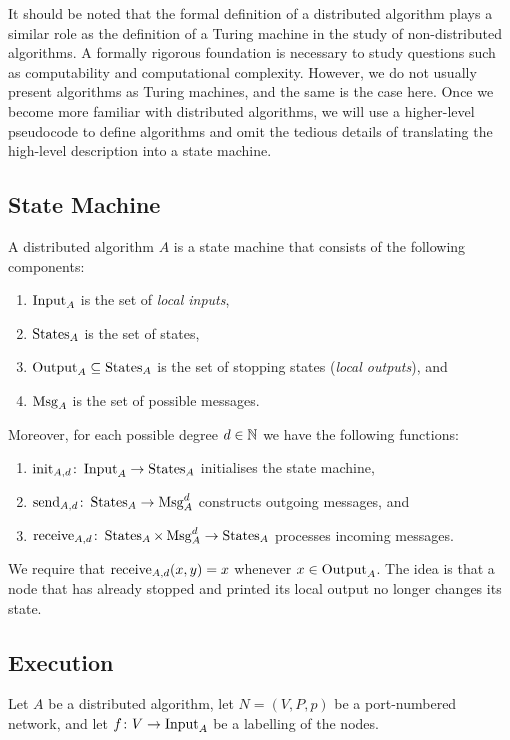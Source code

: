 It should be noted that the formal definition of a distributed algorithm plays a similar role as the definition of a Turing machine in the study of non-distributed algorithms. A formally rigorous foundation is necessary to study questions such as computability and computational complexity. However, we do not usually present algorithms as Turing machines, and the same is the case here. Once we become more familiar with distributed algorithms, we will use a higher-level pseudocode to define algorithms and omit the tedious details of translating the high-level description into a state machine.

\subsection{State Machine}

A distributed algorithm $A$ is a state machine that consists of the following components:
\begin{enumerate}[label=(\roman*)]
    \item $\operatorname{Input}_A$ is the set of \emph{local inputs},
    \item $\operatorname{States}_A$ is the set of states,
    \item $\operatorname{Output}_A \subseteq \operatorname{States}_A$ is the set of stopping states (\emph{local outputs}), and
    \item $\operatorname{Msg}_A$ is the set of possible messages.
\end{enumerate}
Moreover, for each possible degree $d \in \mathbb{N}$ we have the following functions:
\begin{enumerate}[resume*]
    \item $\operatorname{init}_{A,d} \colon \operatorname{Input}_A \to \operatorname{States}_A$ initialises the state machine,
    \item $\operatorname{send}_{A,d} \colon \operatorname{States}_A \to \operatorname{Msg}_A^d$ constructs outgoing messages, and
    \item $\operatorname{receive}_{A,d} \colon \operatorname{States}_A \times \operatorname{Msg}_A^d \to \operatorname{States}_A$ processes incoming messages.
\end{enumerate}
We require that $\operatorname{receive}_{A,d}(x,y) = x$ whenever $x \in \operatorname{Output}_A$. The idea is that a node that has already stopped and printed its local output no longer changes its state.

\subsection{Execution}\label{ssec:execution}

Let $A$ be a distributed algorithm, let $N = (V,P,p)$ be a port-numbered network, and let $f\colon V \to \operatorname{Input}_A$ be a labelling of the nodes.

